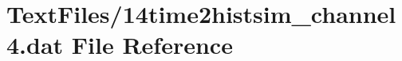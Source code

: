 \hypertarget{14time2histsim__channel4_8dat}{}\section{Text\+Files/14time2histsim\+\_\+channel4.dat File Reference}
\label{14time2histsim__channel4_8dat}
